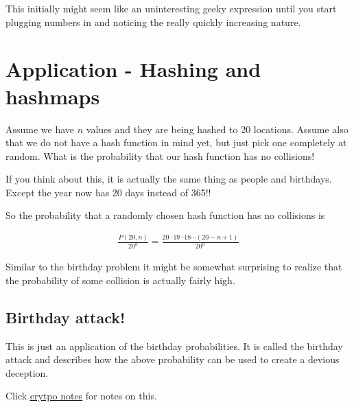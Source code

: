 \documentclass[12pt]{article}
\begin{document}
This initially might seem like an uninteresting geeky expression until you start plugging numbers in and noticing the really quickly increasing nature.

\section*{Application - Hashing and hashmaps}

Assume we have $n$ values and they are being hashed to 20 locations. Assume also that we do not have a hash function in mind yet, but just pick one completely at random. What is the probability that our hash function has no collisions!

If you think about this, it is actually the same thing as people and birthdays. Except the year now has 20 days instead of 365!!

So the probability that a randomly chosen hash function has no collisions is

\begin{align*}
\frac{P(20, n)}{20^n} = \frac{20 \cdot 19 \cdot 18 \cdots (20 - n + 1)} {20^n}
\end{align*}

Similar to the birthday problem it might be somewhat surprising to realize that the probability of some collision is actually fairly high.

\subsection*{Birthday attack!}

This is just an application of the birthday probabilities. It is called the birthday attack and describes how the above probability can be used to create a devious deception.

Click \href{http://www.facweb.iitkgp.ernet.in/~sourav/lecture_note9.pdf}{ \underline{crytpo notes}} for notes on this.
\end{document}
